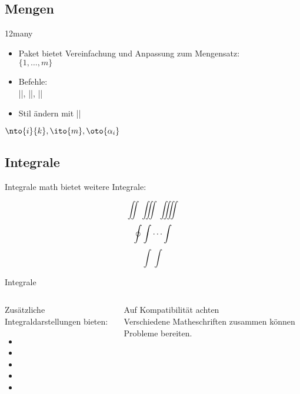 \documentclass[
	vorläufig=false,
	datum=2022-11-09,
	titel={Mathematiksatz},
	web=false,
	max,
	aspectratio=1610,
]{../tex/latexkurs-slides}
\begin{document}
\subsection{Mengen}
\begin{frame}[fragile]{12many}
\begin{itemize}
\item Paket  bietet Vereinfachung und Anpassung zum Mengensatz:\\%
\(\{1, \dots, m\}\)
\item Befehle:\\
||, ||, ||
\item Stil ändern mit ||
\end{itemize}
\begin{LTXexample}[width=.6\textwidth]
\( \nto{i}{k},
  \ito{m},
  \oto{\alpha_i} \)
\end{LTXexample}
\end{frame}


\subsection{Integrale}
\begin{frame}[fragile]{Integrale}
\AmS{}math bietet weitere Integrale:
\begin{LTXexample}[width=.45\textwidth]
\[ \iint \iiint \iiiint \]
\[ \oint \idotsint \]
\[ \int \int \]
\end{LTXexample}
\end{frame}

\begin{frame}[fragile]{Integrale}
\begin{columns}
\begin{column}{.4\textwidth}
Zusätzliche Integraldarstellungen bieten:
\begin{itemize}
\item {}
\item {}
\item {}
\item {}
\item {}
\end{itemize}
\end{column}
\begin{column}{.5\textwidth}
\alert{Auf Kompatibilität achten}\\
Verschiedene Matheschriften zusammen können Probleme bereiten.
\end{column}
\end{columns}
\end{frame}
\end{document}
